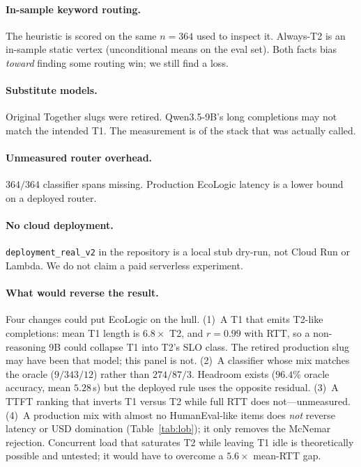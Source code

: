 \documentclass[10pt,conference]{IEEEtran}
\begin{document}
\paragraph{In-sample keyword routing.}
The heuristic is scored on the same $n{=}364$ used to inspect it. Always-T2 is an in-sample static vertex (unconditional means on the eval set). Both facts bias \emph{toward} finding some routing win; we still find a loss.

\paragraph{Substitute models.}
Original Together slugs were retired. Qwen3.5-9B's long completions may not match the intended T1. The measurement is of the stack that was actually called.

\paragraph{Unmeasured router overhead.}
$364/364$ classifier spans missing. Production EcoLogic latency is a lower bound on a deployed router.

\paragraph{No cloud deployment.}
\texttt{deployment\_real\_v2} in the repository is a local stub dry-run, not Cloud Run or Lambda. We do not claim a paid serverless experiment.

\paragraph{What would reverse the result.}
Four changes could put EcoLogic on the hull. (1)~A T1 that emits T2-like completions: mean T1 length is $6.8\times$ T2, and $r{=}0.99$ with RTT, so a non-reasoning 9B could collapse T1 into T2's SLO class. The retired production slug may have been that model; this panel is not. (2)~A classifier whose mix matches the oracle ($9/343/12$) rather than $274/87/3$. Headroom exists ($96.4\%$ oracle accuracy, mean $5.28$\,s) but the deployed rule uses the opposite residual. (3)~A TTFT ranking that inverts T1 versus T2 while full RTT does not---unmeasured. (4)~A production mix with almost no HumanEval-like items does \emph{not} reverse latency or USD domination (Table~\ref{tab:lob}); it only removes the McNemar rejection. Concurrent load that saturates T2 while leaving T1 idle is theoretically possible and untested; it would have to overcome a $5.6\times$ mean-RTT gap.
\end{document}
